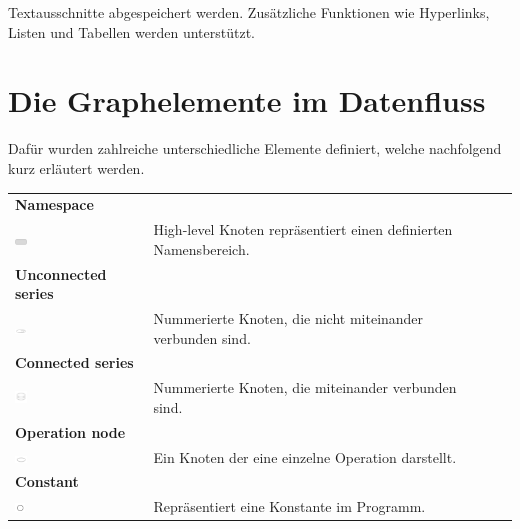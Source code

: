 Textausschnitte abgespeichert werden. Zusätzliche Funktionen wie Hyperlinks, Listen und Tabellen werden unterstützt. \cite{tensorboard.2017}





\newpage

\section{Die Graphelemente im Datenfluss}

 Dafür wurden zahlreiche unterschiedliche Elemente definiert, welche nachfolgend kurz erläutert werden. \cite{graph_viz}
\\

\begin{tabular}{ p{4cm}p{10.8cm} ll }

\textbf{Namespace} \tabularnewline 
\includegraphics[width=0.1\textwidth]{images/Kapitel_3/namespace.png}
\label{fig:namespace}
 & High-level Knoten repräsentiert einen definierten Namensbereich.   \tabularnewline
  
\textbf{Unconnected series} \tabularnewline 
\includegraphics[width=0.1\textwidth]{images/Kapitel_3/Unconnected_series.png}
\label{fig:Unconnected_series}
 & Nummerierte Knoten, die nicht miteinander verbunden sind. \tabularnewline
  
\textbf{Connected series} \tabularnewline 
\includegraphics[width=0.1\textwidth]{images/Kapitel_3/Connected_series.png}
\label{fig:Connected_series}
 & Nummerierte Knoten, die miteinander verbunden sind. \tabularnewline 
 
\textbf{Operation node} \tabularnewline 
\includegraphics[width=0.1\textwidth]{images/Kapitel_3/Operation_node.png}
\label{fig:Operation_node}
 & Ein Knoten der eine einzelne Operation darstellt.  \tabularnewline 
 
\textbf{Constant} \tabularnewline 
\includegraphics[width=0.08\textwidth]{images/Kapitel_3/Constant.png}
\label{fig:Constant}
 & Repräsentiert eine Konstante im Programm.  \tabularnewline 


\end{tabular}

